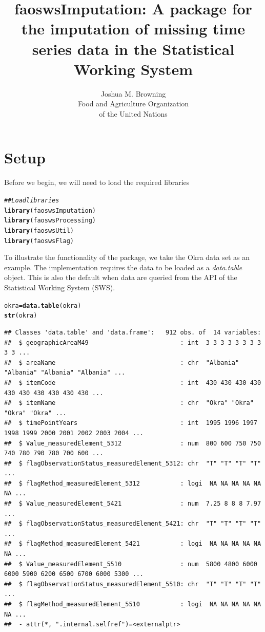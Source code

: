 \documentclass[nojss]{jss}\usepackage[]{graphicx}\usepackage[]{color}
\title{\bf faoswsImputation: A package for the imputation of missing time
series data in the Statistical Working System}
\author{Joshua M. Browning\\ Food and Agriculture
    Organization \\ of the United Nations\\}
\makeatletter
\newcommand{\hlcom}[1]{\textcolor[rgb]{0.678,0.584,0.686}{\textit{#1}}}%
\newcommand{\hlstd}[1]{\textcolor[rgb]{0.345,0.345,0.345}{#1}}%
\newcommand{\hlkwb}[1]{\textcolor[rgb]{0.69,0.353,0.396}{#1}}%
\newcommand{\hlkwd}[1]{\textcolor[rgb]{0.737,0.353,0.396}{\textbf{#1}}}%
\newenvironment{kframe}{%
 \def\at@end@of@kframe{}%
 \ifinner\ifhmode%
  \def\at@end@of@kframe{\end{minipage}}%
  \begin{minipage}{\columnwidth}%
 \fi\fi%
 \def\FrameCommand##1{\hskip\@totalleftmargin \hskip-\fboxsep
 \colorbox{shadecolor}{##1}\hskip-\fboxsep
     \hskip-\linewidth \hskip-\@totalleftmargin \hskip\columnwidth}%
 \MakeFramed {\advance\hsize-\width
   \@totalleftmargin\z@ \linewidth\hsize
   \@setminipage}}%
 {\par\unskip\endMakeFramed%
 \at@end@of@kframe}
\newenvironment{knitrout}{}{} %
\makeatother
\begin{document}



\section{Setup}

Before we begin, we will need to load the required libraries

\begin{knitrout}
\color{fgcolor}\begin{kframe}
\begin{alltt}
\hlcom{## Load libraries}
\hlkwd{library}\hlstd{(faoswsImputation)}
\hlkwd{library}\hlstd{(faoswsProcessing)}
\hlkwd{library}\hlstd{(faoswsUtil)}
\hlkwd{library}\hlstd{(faoswsFlag)}
\end{alltt}
\end{kframe}
\end{knitrout}

To illustrate the functionality of the package, we take the Okra data
set as an example. The implementation requires the data to be loaded as
a \textit{data.table} object. This is also the default when data are
queried from the API of the Statistical Working System (SWS).

\begin{knitrout}
\color{fgcolor}\begin{kframe}
\begin{alltt}
\hlstd{okra} \hlkwb{=} \hlkwd{data.table}\hlstd{(okra)}
\hlkwd{str}\hlstd{(okra)}
\end{alltt}
\begin{verbatim}
## Classes 'data.table' and 'data.frame':	912 obs. of  14 variables:
##  $ geographicAreaM49                         : int  3 3 3 3 3 3 3 3 3 3 ...
##  $ areaName                                  : chr  "Albania" "Albania" "Albania" "Albania" ...
##  $ itemCode                                  : int  430 430 430 430 430 430 430 430 430 430 ...
##  $ itemName                                  : chr  "Okra" "Okra" "Okra" "Okra" ...
##  $ timePointYears                            : int  1995 1996 1997 1998 1999 2000 2001 2002 2003 2004 ...
##  $ Value_measuredElement_5312                : num  800 600 750 750 740 780 790 780 700 600 ...
##  $ flagObservationStatus_measuredElement_5312: chr  "T" "T" "T" "T" ...
##  $ flagMethod_measuredElement_5312           : logi  NA NA NA NA NA NA ...
##  $ Value_measuredElement_5421                : num  7.25 8 8 8 7.97 ...
##  $ flagObservationStatus_measuredElement_5421: chr  "T" "T" "T" "T" ...
##  $ flagMethod_measuredElement_5421           : logi  NA NA NA NA NA NA ...
##  $ Value_measuredElement_5510                : num  5800 4800 6000 6000 5900 6200 6500 6700 6000 5300 ...
##  $ flagObservationStatus_measuredElement_5510: chr  "T" "T" "T" "T" ...
##  $ flagMethod_measuredElement_5510           : logi  NA NA NA NA NA NA ...
##  - attr(*, ".internal.selfref")=<externalptr>
\end{verbatim}
\end{kframe}
\end{knitrout}
\end{document}
